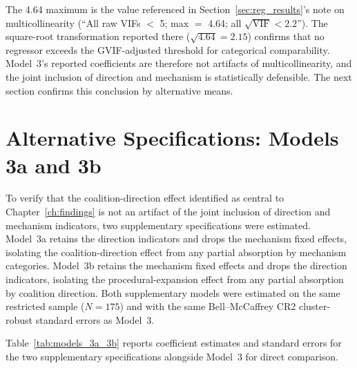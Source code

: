\documentclass[12pt]{report}
\begin{document}
The 4.64 maximum is the value referenced in Section~\ref{sec:reg_results}'s note on
multicollinearity (\enquote{All raw VIFs $<$ 5; max $=$ 4.64; all
$\sqrt{\text{VIF}}<2.2$}). The square-root transformation reported there
($\sqrt{4.64}=2.15$) confirms that no regressor exceeds the GVIF-adjusted threshold for
categorical comparability. Model~3's reported coefficients are therefore not artifacts
of multicollinearity, and the joint inclusion of direction and mechanism is statistically
defensible. The next section confirms this conclusion by alternative means.

\section{Alternative Specifications: Models 3a and 3b}
\label{app:C.2}

To verify that the coalition-direction effect identified as central to
Chapter~\ref{ch:findings} is not an artifact of the joint inclusion of direction and
mechanism indicators, two supplementary specifications were estimated. Model~3a retains
the direction indicators and drops the mechanism fixed effects, isolating the
coalition-direction effect from any partial absorption by mechanism categories.
Model~3b retains the mechanism fixed effects and drops the direction indicators,
isolating the procedural-expansion effect from any partial absorption by coalition
direction. Both supplementary models were estimated on the same restricted sample
($N = 175$) and with the same Bell--McCaffrey CR2 cluster-robust standard errors as
Model~3.

Table~\ref{tab:models_3a_3b} reports coefficient estimates and standard errors for the
two supplementary specifications alongside Model~3 for direct comparison.
\end{document}
